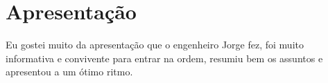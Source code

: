 
\section{Apresentação}

Eu gostei muito da apresentação que o engenheiro Jorge fez, foi muito informativa e convivente para entrar na ordem, resumiu bem os assuntos e apresentou a um ótimo ritmo.


